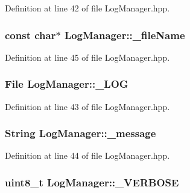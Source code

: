 Definition at line 42 of file Log\+Manager.\+hpp.

\subsubsection[{\texorpdfstring{\+\_\+file\+Name}{_fileName}}]{\setlength{\rightskip}{0pt plus 5cm}const char$\ast$ Log\+Manager\+::\+\_\+file\+Name\hspace{0.3cm}{\ttfamily [protected]}}\hypertarget{class_log_manager_a8fd05d3a6e874fc98a8057999572017a}{}\label{class_log_manager_a8fd05d3a6e874fc98a8057999572017a}


Definition at line 45 of file Log\+Manager.\+hpp.

\subsubsection[{\texorpdfstring{\+\_\+\+L\+OG}{_LOG}}]{\setlength{\rightskip}{0pt plus 5cm}File Log\+Manager\+::\+\_\+\+L\+OG\hspace{0.3cm}{\ttfamily [protected]}}\hypertarget{class_log_manager_ab960f79fee84861dda97a4ca0db27cf4}{}\label{class_log_manager_ab960f79fee84861dda97a4ca0db27cf4}


Definition at line 43 of file Log\+Manager.\+hpp.

\subsubsection[{\texorpdfstring{\+\_\+message}{_message}}]{\setlength{\rightskip}{0pt plus 5cm}String Log\+Manager\+::\+\_\+message\hspace{0.3cm}{\ttfamily [protected]}}\hypertarget{class_log_manager_a1e56e442c5de5bd098ac4a822797de0a}{}\label{class_log_manager_a1e56e442c5de5bd098ac4a822797de0a}


Definition at line 44 of file Log\+Manager.\+hpp.

\subsubsection[{\texorpdfstring{\+\_\+\+V\+E\+R\+B\+O\+SE}{_VERBOSE}}]{\setlength{\rightskip}{0pt plus 5cm}uint8\+\_\+t Log\+Manager\+::\+\_\+\+V\+E\+R\+B\+O\+SE\hspace{0.3cm}{\ttfamily [protected]}}\hypertarget{class_log_manager_aa20970098e6a6930fd54c026bef410f9}{}\label{class_log_manager_aa20970098e6a6930fd54c026bef410f9}


